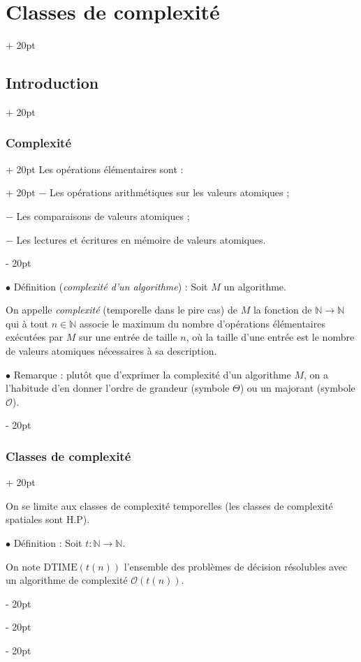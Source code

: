 \documentclass[a4paper, 12pt, twoside]{article}
\newcommand{\N}{\mathbb{N}} %
\newcommand{\ind}[1][20pt]{\advance\leftskip + #1}
\newcommand{\deind}[1][20pt]{\advance\leftskip - #1}
\newenvironment{indt}[2][20pt]{#2 \par \ind[#1]}{\par \deind} %
\begin{document}
\begin{indt}{\section{Classes de complexité}}
\begin{indt}{\subsection{Introduction}}
\begin{indt}{\subsubsection{Complexité}}
                \begin{indt}{Les opérations élémentaires sont :}
                    $-$ Les opérations arithmétiques sur les valeurs atomiques ;

                    $-$ Les comparaisons de valeurs atomiques ;

                    $-$ Les lectures et écritures en mémoire de valeurs atomiques.
                \end{indt}

                \vspace{12pt}
                
                $\bullet$ Définition (\textit{complexité d'un algorithme}) :
                Soit $M$ un algorithme.

                On appelle \emph{complexité} (temporelle dans le pire cas) de $M$ la fonction de $\N \longrightarrow \N$ qui à tout $n \in \N$ associe le maximum du nombre d'opérations élémentaires exécutées par $M$ sur une entrée de taille $n$, où la taille d'une entrée est le nombre de valeurs atomiques nécessaires à sa description.

                \vspace{12pt}
                
                $\bullet$ Remarque : plutôt que d'exprimer la complexité d'un algorithme $M$, on a l'habitude d'en donner l'ordre de grandeur (symbole $\Theta$) ou un majorant (symbole $\mathcal O$).
            \end{indt}

            \vspace{12pt}
            
            \begin{indt}{\subsubsection{Classes de complexité}}
                \label{2.1.3}

                On se limite aux classes de complexité temporelles (les classes de complexité spatiales sont H.P).

                \vspace{12pt}
                
                $\bullet$ Définition :
                Soit $t : \N \longrightarrow \N$.

                On note $\mathrm{DTIME}(t(n))$ l'ensemble des problèmes de décision résolubles avec un algorithme de complexité $\mathcal O(t(n))$.


\end{indt}
\end{indt}
\end{indt}
\end{document}
